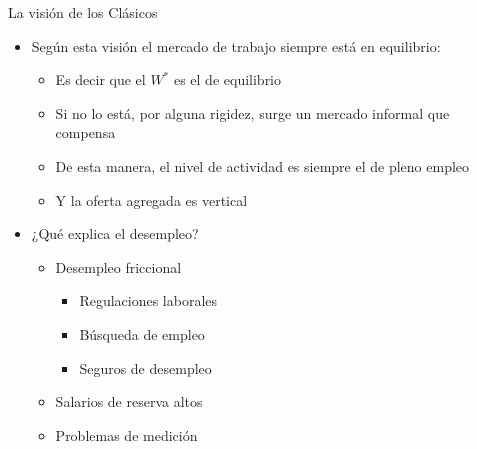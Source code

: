 \documentclass{beamer}
\begin{document}
\begin{frame}{La visión de los Clásicos}
    \begin{itemize}
        \item Según esta visión el mercado de trabajo siempre está en equilibrio:
        \begin{itemize}
        \item Es decir que el $W^{*}$ es el de equilibrio
        \item Si no lo está, por alguna rigidez, surge un mercado informal que compensa
        \item De esta manera, el nivel de actividad es siempre el de pleno empleo
        \item Y la oferta agregada es vertical
        \end{itemize}
        \item ¿Qué explica el desempleo?
        \begin{itemize}
            \item Desempleo friccional
            \begin{itemize}
                \item Regulaciones laborales
                \item Búsqueda de empleo
                \item Seguros de desempleo
            \end{itemize}
            \item Salarios de reserva altos
            \item Problemas de medición
        \end{itemize}
    \end{itemize}
\end{frame}
\end{document}
